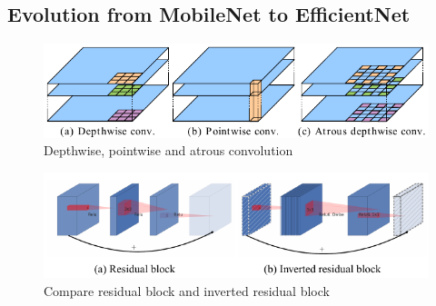 \subsection{Evolution from MobileNet to EfficientNet}
\citet{howard2017mobilenets}

\begin{figure}[!ht]
    \centering
    \includegraphics[width=.9\textwidth]{literature/imgs/ext-2-mobile-depth-point-atrous.pdf}
    \caption{Depthwise, pointwise and atrous convolution \cite{chen2018encoder}}
    \label{fig:ext-2-mobile-depth-point-atrous}
\end{figure}

\citet{sandler2018mobilenetv2}

\begin{figure}[!ht]
    \centering
    \includegraphics[width=.95\textwidth]{literature/imgs/ext-inverted-residual.pdf}
    \caption{Compare residual block and inverted residual block \cite{sandler2018mobilenetv2}}
    \label{fig:ext-inverted-residual}
\end{figure}

\citet{howard2019searching}

\citet{tan2020efficientnet}

\citet{tan2021efficientnetv2}
